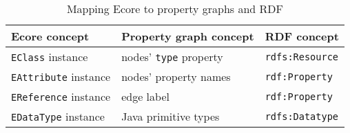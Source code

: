 \begin{table}[htb]

\centering
\begin{tabular}{ | l | l | l | }

\hline
\bf Ecore concept          & \bf Property graph concept  & \bf RDF concept \tabularnewline \hline\hline
\verb+EClass+ instance     & nodes' \verb+type+ property & \verb+rdfs:Resource+ \\ \hline
\verb+EAttribute+ instance & nodes' property names       & \verb+rdf:Property+  \\ \hline
\verb+EReference+ instance & edge label                  & \verb+rdf:Property+  \\ \hline
\verb+EDataType+ instance  & Java primitive types        & \verb+rdfs:Datatype+ \\ \hline
 
\end{tabular}
\caption{Mapping Ecore to property graphs and RDF}
\label{tab:ecore-mapping}

\end{table}




% 
% 
